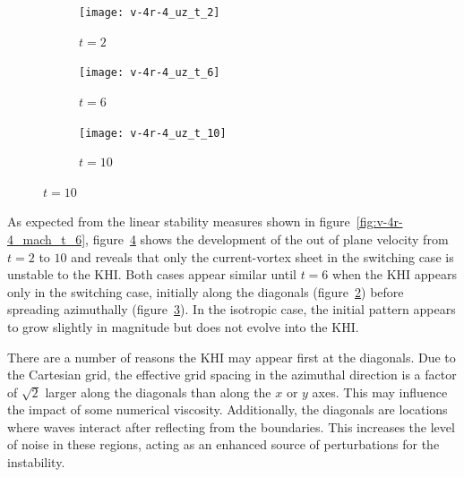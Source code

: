 \begin{figure}[t]
  \centering
    \begin{subfigure}{0.32\textwidth}
      \texttt{[image: v-4r-4\_uz\_t\_2]}
      \caption{$t=2$}
      \label{fig:v-4r-4_uz_t_2}
    \end{subfigure}
    \begin{subfigure}{0.32\textwidth}
      \texttt{[image: v-4r-4\_uz\_t\_6]}
      \caption{$t=6$}
      \label{fig:v-4r-4_uz_t_6}
    \end{subfigure}
    \begin{subfigure}{0.32\textwidth}
      \texttt{[image: v-4r-4\_uz\_t\_10]}
      \caption{$t=10$}
      \label{fig:v-4r-4_uz_t_10}
    \end{subfigure}
\label{fig:out_of_plane_velocity}%
\end{figure}

As expected from the linear stability measures shown in figure~\ref{fig:v-4r-4_mach_t_6}, figure~\ref{fig:out_of_plane_velocity} shows the development of the out of plane velocity from $t=2$ to $10$ and reveals that only the current-vortex sheet in the switching case is unstable to the KHI. Both cases appear similar until $t=6$ when the KHI appears only in the switching case, initially along the diagonals (figure~\ref{fig:v-4r-4_uz_t_6}) before spreading azimuthally (figure~\ref{fig:v-4r-4_uz_t_10}). In the isotropic case, the initial pattern appears to grow slightly in magnitude but does not evolve into the KHI.

There are a number of reasons the KHI may appear first at the diagonals. Due to the Cartesian grid, the effective grid spacing in the azimuthal direction is a factor of $\sqrt{2}$ larger along the diagonals than along the $x$ or $y$ axes. This may influence the impact of some numerical viscosity. Additionally, the diagonals are locations where waves interact after reflecting from the boundaries. This increases the level of noise in these regions, acting as an enhanced source of perturbations for the instability.

